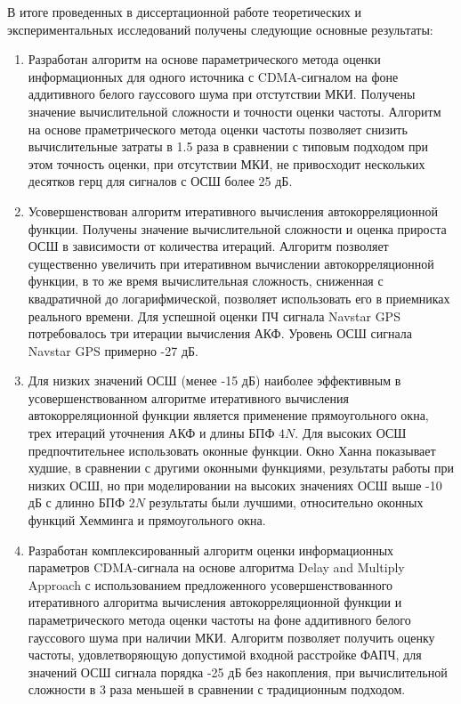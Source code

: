 В итоге проведенных в диссертационной работе теоретических и экспериментальных исследований получены следующие основные результаты:
\begin{enumerate}
	\item Разработан алгоритм на основе параметрического метода оценки информационных для одного источника с CDMA-сигналом на фоне аддитивного белого гауссового шума при отстутствии МКИ.
		Получены значение вычислительной сложности и точности оценки частоты. Алгоритм на основе праметрического метода оценки частоты позволяет снизить вычислительные
		затраты в 1.5 раза в сравнении с типовым подходом при этом точность оценки, при отсутствии МКИ, не привосходит нескольких десятков герц для сигналов
		с ОСШ более 25 дБ.
	\item Усовершенствован алгоритм итеративного вычисления автокорреляционной функции. Получены значение вычислительной сложности и оценка
		прироста ОСШ в зависимости от количества итераций. Алгоритм позволяет существенно увеличить при итеративном вычислении
		автокорреляционной функции, в то же время вычислительная сложность, сниженная с квадратичной до логарифмической,
		позволяет использовать его в приемниках реального времени. Для успешной оценки ПЧ сигнала Navstar GPS потребовалось три итерации вычисления АКФ.
		Уровень ОСШ сигнала Navstar GPS примерно -27 дБ.
	\item Для низких значений ОСШ (менее -15 дБ) наиболее эффективным в усовершенствованном алгоритме итеративного вычисления автокорреляционной функции
		является применение прямоугольного окна, трех итераций уточнения АКФ и длины БПФ ${4N}$.
		Для высоких ОСШ предпочтительнее использовать оконные функции. Окно Ханна показывает худшие, в сравнении с другими оконными функциями,
		результаты работы при низких ОСШ, но при моделировании на высоких значениях ОСШ выше -10 дБ с длинно БПФ ${2N}$ результаты были лучшими,
		относительно оконных функций Хемминга и прямоугольного окна.
	\item Разработан комплексированный алгоритм оценки информационных параметров CDMA-сигнала на основе алгоритма Delay and Multiply Approach с использованием
		предложенного усовершенствованного итеративного алгоритма вычисления автокорреляционной функции и параметрического
		метода оценки частоты на фоне аддитивного белого гауссового шума при наличии МКИ. Алгоритм позволяет получить оценку частоты, удовлетворяющую
		допустимой входной расстройке ФАПЧ, для значений ОСШ сигнала порядка -25 дБ без накопления, при вычислительной сложности в 3 раза меньшей в сравнении с традиционным подходом.

\end{enumerate}

